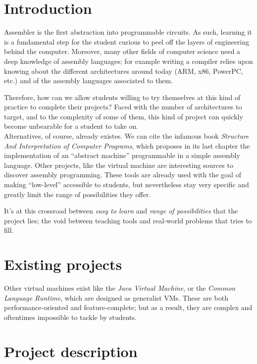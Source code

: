 \documentclass[11pt,twoside]{article}
\begin{document}
\section{Introduction}

Assembler is the first abstraction into programmable circuits. As such, learning it is a fundamental step for the student curious to peel off the layers of engineering behind the computer. Moreover, many other fields of computer science need a deep knowledge of assembly languages; for example writing a compiler relies upon knowing about the different architectures around today (ARM, x86, PowerPC, etc.) and of the assembly languages associated to them.

Therefore, how can we allow students willing to try themselves at this kind of practice to complete their projects? Faced with the number of architectures to target, and to the complexity of some of them, this kind of project can quickly become unbearable for a student to take on.\\
Alternatives, of course, already existes. We can cite the infamous book \emph{Structure And Interpretation of Computer Programs}\cite{SICP}, which proposes in its last chapter the implementation of an ``abstract machine'' programmable in a simple assembly language. Other projects, like the virtual machine  are interesting sources to discover assembly programming\cite{CHIP8}. These tools are already used with the goal of making ``low-level'' accessible to students, but nevertheless stay very specific and greatly limit the range of possibilities they offer.

It's at this crossroad between \emph{easy to learn} and \emph{range of possibilities} that the project lies; the void between teaching tools and real-world problems that  tries to fill.

\section{Existing projects}

Other virtual machines exist like the \emph{Java Virtual Machine}, or the \emph{Common Language Runtime}, which are designed as generalist VMs. These are both performance-oriented and feature-complete; but as a result, they are complex and oftentimes impossible to tackle by students.

\vfill
\newpage

\section{Project description}
\end{document}
